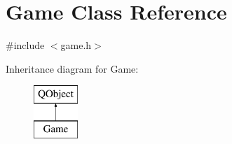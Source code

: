 \hypertarget{class_game}{}\section{Game Class Reference}
\label{class_game}


{\ttfamily \#include $<$game.\+h$>$}

Inheritance diagram for Game\+:\begin{figure}[H]
\begin{center}
\leavevmode
\includegraphics[height=2.000000cm]{class_game}
\end{center}
\end{figure}
